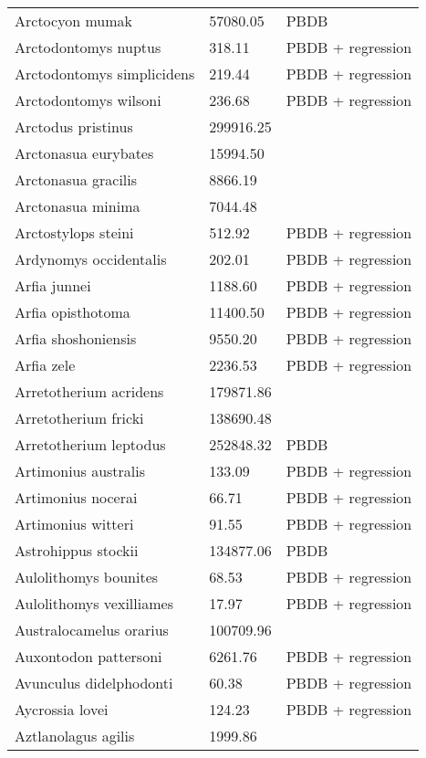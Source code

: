 \documentclass{article}
\begin{document}
\begin{center}
\begin{longtable}{p{} p{} p{} }
  Arctocyon mumak & 57080.05 & PBDB \\ 
  Arctodontomys nuptus & 318.11 & PBDB + regression \\ 
  Arctodontomys simplicidens & 219.44 & PBDB + regression \\ 
  Arctodontomys wilsoni & 236.68 & PBDB + regression \\ 
  Arctodus pristinus & 299916.25 & \cite{Smith2004} \\ 
  Arctonasua eurybates & 15994.50 & \cite{Tomiya2013} \\ 
  Arctonasua gracilis & 8866.19 & \cite{Tomiya2013} \\ 
  Arctonasua minima & 7044.48 & \cite{Tomiya2013} \\ 
  Arctostylops steini & 512.92 & PBDB + regression \\ 
  Ardynomys occidentalis & 202.01 & PBDB + regression \\ 
  Arfia junnei & 1188.60 & PBDB + regression \\ 
  Arfia opisthotoma & 11400.50 & PBDB + regression \\ 
  Arfia shoshoniensis & 9550.20 & PBDB + regression \\ 
  Arfia zele & 2236.53 & PBDB + regression \\ 
  Arretotherium acridens & 179871.86 & \cite{Tomiya2013} \\ 
  Arretotherium fricki & 138690.48 & \cite{Tomiya2013} \\ 
  Arretotherium leptodus & 252848.32 & PBDB \\ 
  Artimonius australis & 133.09 & PBDB + regression \\ 
  Artimonius nocerai & 66.71 & PBDB + regression \\ 
  Artimonius witteri & 91.55 & PBDB + regression \\ 
  Astrohippus stockii & 134877.06 & PBDB \\ 
  Aulolithomys bounites & 68.53 & PBDB + regression \\ 
  Aulolithomys vexilliames & 17.97 & PBDB + regression \\ 
  Australocamelus orarius & 100709.96 & \cite{Tomiya2013} \\ 
  Auxontodon pattersoni & 6261.76 & PBDB + regression \\ 
  Avunculus didelphodonti & 60.38 & PBDB + regression \\ 
  Aycrossia lovei & 124.23 & PBDB + regression \\ 
  Aztlanolagus agilis & 1999.86 & \cite{Smith2004} \\ 

\end{longtable}
\end{center}
\end{document}
